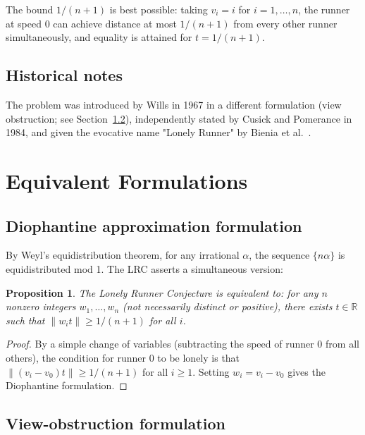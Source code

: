 \documentclass[12pt,a4paper]{amsart}
\newtheorem{proposition}[theorem]{Proposition}
\theoremstyle{definition}
\theoremstyle{remark}
\newcommand{\R}{\mathbb{R}}
\begin{document}
The bound $1/(n+1)$ is best possible: taking $v_i = i$ for $i = 1, \ldots, n$,
the runner at speed 0 can achieve distance at most $1/(n+1)$ from every other
runner simultaneously, and equality is attained for $t = 1/(n+1)$.

\subsection{Historical notes}

The problem was introduced by Wills \cite{Wills1967} in 1967 in a different
formulation (view obstruction; see Section~\ref{sec:view}), independently
stated by Cusick and Pomerance \cite{CusickPomerance1984} in 1984, and given
the evocative name "Lonely Runner" by Bienia et al.\ \cite{BieniaEtal1998}.

\section{Equivalent Formulations}\label{sec:equiv}

\subsection{Diophantine approximation formulation}

By Weyl's equidistribution theorem, for any irrational $\alpha$, the sequence
$\{n\alpha\}$ is equidistributed mod 1. The LRC asserts a simultaneous version:

\begin{proposition}\label{prop:diophantine}
The Lonely Runner Conjecture is equivalent to: for any $n$ nonzero integers
$w_1, \ldots, w_n$ (not necessarily distinct or positive), there exists $t \in \R$
such that $\|w_i t\| \geq 1/(n+1)$ for all $i$.
\end{proposition}

\begin{proof}
By a simple change of variables (subtracting the speed of runner 0 from all others),
the condition for runner 0 to be lonely is that $\|(v_i - v_0)t\| \geq 1/(n+1)$
for all $i \geq 1$. Setting $w_i = v_i - v_0$ gives the Diophantine formulation.
\end{proof}

\subsection{View-obstruction formulation}\label{sec:view}
\end{document}
